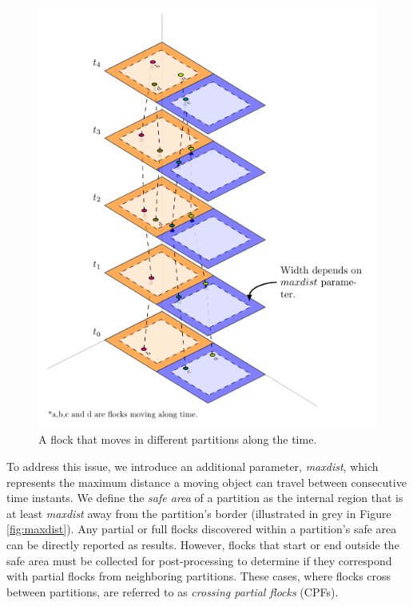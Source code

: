 \begin{figure}
    \centering
    \includegraphics[width=0.8\linewidth]
    {chapterPFlocks/figures/plots/11_temporal_partitions/TemporalPartitioning.pdf}
    \caption{A flock that moves in different partitions along the time.}\label{fig:simple_alternative}
\end{figure}


To address this issue, we introduce an additional parameter, \textit{maxdist}, which represents the maximum distance a moving object can travel between 
consecutive time instants. We define the \textit{safe area} of a partition as the internal region that is at least \textit{maxdist} away from the partition’s 
border (illustrated in grey in Figure \ref{fig:maxdist}). Any partial or full flocks discovered within a partition’s safe area can be directly reported as 
results. However, flocks that start or end outside the safe area must be collected for post-processing to determine if they correspond with partial flocks from 
neighboring partitions. These cases, where flocks cross between partitions, are referred to as \textit{crossing partial flocks} (CPFs).


